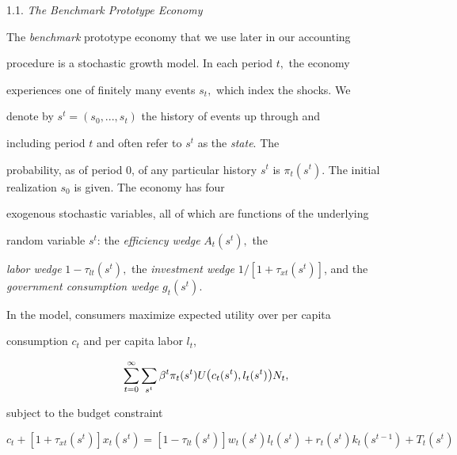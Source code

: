 \documentclass[fleqn,leqno,11pt]{article}
\begin{document}
\bigskip



\begin{center}

1.1. \emph{The Benchmark Prototype Economy}

\end{center}



The \emph{benchmark }prototype economy that we use later in our accounting

procedure is a stochastic growth model. In each period $t,$ the economy

experiences one of finitely many events $s_{t},$ which index the shocks. We

denote by $s^{t}=(s_{0},...,s_{t})$ the history of events up through and

including period $t$ and often refer to $s^{t}$ as the \textit{state}. The

probability, as of period $0$, of any particular history $s^{t}$ is $\pi

_{t}(s^{t})$. The initial realization $s_{0}$ is given. The economy has four

exogenous stochastic variables, all of which are functions of the underlying

random variable $s^{t}$: the \textit{efficiency wedge }$A_{t}(s^{t}),$ the 

\textit{labor wedge }$1-\tau _{lt}(s^{t}),$ the \textit{investment wedge} $%

1/[1+\tau _{xt}(s^{t})]$, and the \textit{government consumption wedge }$%

g_{t}(s^{t})$.



In the model, consumers maximize expected utility over per capita

consumption $c_{t}$ and per capita labor $l_{t}$, 

\[

\sum_{t=0}^{\infty }\sum_{s^{t}}\beta ^{t}\pi _{t}(s^{t})U\text{{\large (}}%

c_{t}(s^{t}),l_{t}(s^{t})\text{{\large )}}N_{t}, 

\]%

subject to the budget constraint 

\[

c_{t}+[1+\tau _{xt}(s^{t})]x_{t}(s^{t})=[1-\tau

_{lt}(s^{t})]w_{t}(s^{t})l_{t}(s^{t})+r_{t}(s^{t})k_{t}(s^{t-1})+T_{t}(s^{t}) 

\]%
\end{document}
